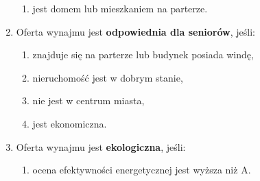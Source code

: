 \begin{enumerate}[label=W\arabic*.]
\begin{enumerate}[label=\arabic*.]
        \item jest domem lub mieszkaniem na parterze.
    \end{enumerate}
    \item Oferta wynajmu jest \textbf{odpowiednia dla seniorów}, jeśli:
    \begin{enumerate}[label=\arabic*.]
        \item znajduje się na parterze lub budynek posiada windę,
        \item nieruchomość jest w dobrym stanie,
        \item nie jest w centrum miasta,
        \item jest ekonomiczna.
    \end{enumerate}
    \item Oferta wynajmu jest \textbf{ekologiczna}, jeśli:
    \begin{enumerate}[label=\arabic*.]
        \item ocena efektywności energetycznej jest wyższa niż A.
    \end{enumerate}
\end{enumerate}


